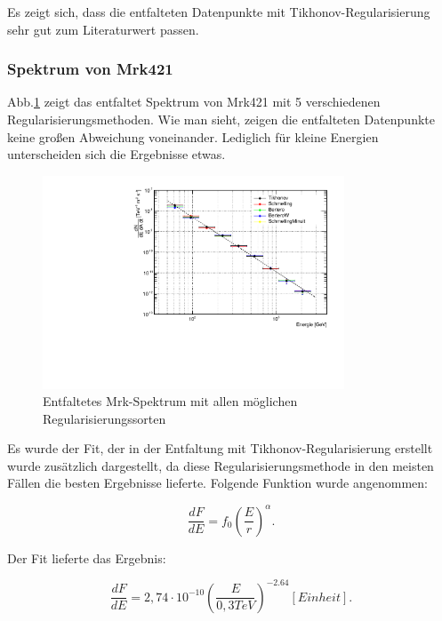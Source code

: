 Es zeigt sich, dass die entfalteten Datenpunkte mit Tikhonov-Regularisierung sehr gut zum Literaturwert passen.

\subsubsection{Spektrum von Mrk421}
Abb.\ref{Datenset2_CombunFold_Mrk421} zeigt das entfaltet Spektrum von Mrk421 mit 5 verschiedenen Regularisierungsmethoden.
Wie man sieht, zeigen die entfalteten Datenpunkte keine großen Abweichung voneinander. 
Lediglich für kleine Energien unterscheiden sich die Ergebnisse etwas.

\begin{figure}
    \centering
    \includegraphics[width=0.8\textwidth]{./Plots/04_MrkAnalyse/Datenset2/Spektrum_Mrk421.pdf}
    \caption{Entfaltetes Mrk-Spektrum mit allen möglichen Regularisierungssorten}
    \label{Datenset2_CombunFold_Mrk421}
\end{figure}

Es wurde der Fit, der in der Entfaltung mit Tikhonov-Regularisierung erstellt wurde zusätzlich dargestellt, da diese Regularisierungsmethode in den meisten Fällen die besten Ergebnisse lieferte.
Folgende Funktion wurde angenommen:

\begin{equation}
 \frac{dF}{dE}=f_0\left( \frac{E}{r} \right)^\alpha.
\end{equation}

Der Fit lieferte das Ergebnis:

\begin{equation}
 \frac{dF}{dE}=2,74 \cdot 10^{-10}\left( \frac{E}{0,3 \si{TeV}} \right)^{-2.64} [Einheit].
\end{equation}


\FloatBarrier

